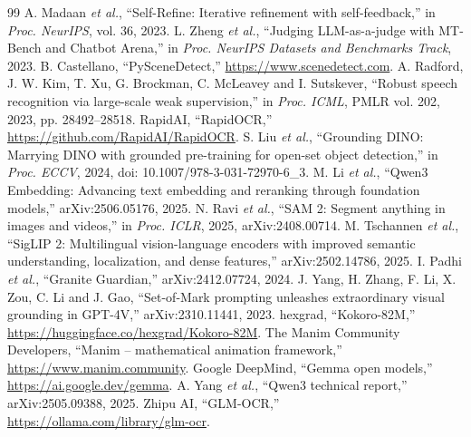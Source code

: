 \documentclass[conference,a4paper]{IEEEtran}
\begin{document}
\begin{thebibliography}{99}
 A. Madaan \emph{et al.}, ``Self-Refine: Iterative refinement with self-feedback,'' in \emph{Proc.
NeurIPS}, vol. 36, 2023.
 L. Zheng \emph{et al.}, ``Judging LLM-as-a-judge with MT-Bench and Chatbot Arena,'' in \emph{Proc.
NeurIPS Datasets and Benchmarks Track}, 2023.
 B. Castellano, ``PySceneDetect,'' \url{https://www.scenedetect.com}.
 A. Radford, J. W. Kim, T. Xu, G. Brockman, C. McLeavey and I. Sutskever, ``Robust speech recognition
via large-scale weak supervision,'' in \emph{Proc. ICML}, PMLR vol. 202, 2023, pp. 28492--28518.
 RapidAI, ``RapidOCR,'' \url{https://github.com/RapidAI/RapidOCR}.
 S. Liu \emph{et al.}, ``Grounding DINO: Marrying DINO with grounded pre-training for open-set
object detection,'' in \emph{Proc. ECCV}, 2024, doi: 10.1007/978-3-031-72970-6\_3.
 M. Li \emph{et al.}, ``Qwen3 Embedding: Advancing text embedding and reranking through foundation
models,'' arXiv:2506.05176, 2025.
 N. Ravi \emph{et al.}, ``SAM 2: Segment anything in images and videos,'' in \emph{Proc. ICLR}, 2025,
arXiv:2408.00714.
 M. Tschannen \emph{et al.}, ``SigLIP 2: Multilingual vision-language encoders with improved semantic
understanding, localization, and dense features,'' arXiv:2502.14786, 2025.
 I. Padhi \emph{et al.}, ``Granite Guardian,'' arXiv:2412.07724, 2024.
 J. Yang, H. Zhang, F. Li, X. Zou, C. Li and J. Gao, ``Set-of-Mark prompting unleashes extraordinary
visual grounding in GPT-4V,'' arXiv:2310.11441, 2023.
 hexgrad, ``Kokoro-82M,'' \url{https://huggingface.co/hexgrad/Kokoro-82M}.
 The Manim Community Developers, ``Manim -- mathematical animation framework,''
\url{https://www.manim.community}.
 Google DeepMind, ``Gemma open models,'' \url{https://ai.google.dev/gemma}.
 A. Yang \emph{et al.}, ``Qwen3 technical report,'' arXiv:2505.09388, 2025.
 Zhipu AI, ``GLM-OCR,'' \url{https://ollama.com/library/glm-ocr}.
\end{thebibliography}
\end{document}
